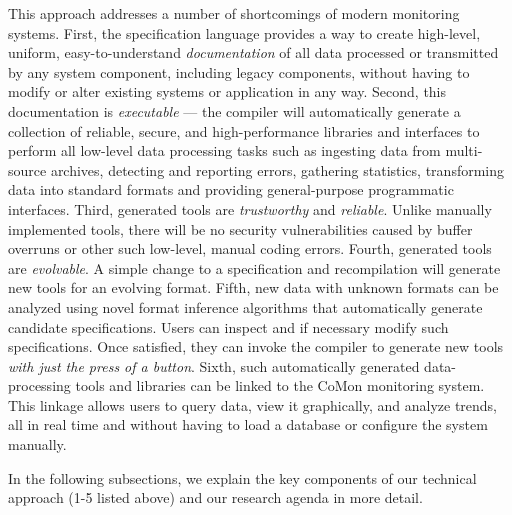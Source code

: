 

This approach addresses a number of shortcomings of modern monitoring
systems.  First, the \pads{} specification language provides a 
way to create high-level, uniform, easy-to-understand {\em documentation}
of all data processed or transmitted by any system component, 
including legacy components, without having to modify or alter existing
systems or
application in any way.  Second, this documentation is 
{\em executable} --- the
\pads{} compiler will automatically generate a collection of
reliable, secure, and high-performance libraries and interfaces
to perform all low-level data processing tasks such as ingesting
data from multi-source archives, detecting and reporting
errors, gathering statistics, 
transforming data into standard formats and providing
general-purpose programmatic interfaces.  Third, generated
tools are {\em trustworthy} and {\em reliable}. Unlike manually 
implemented tools, there will be no security vulnerabilities caused by
buffer overruns or other such low-level, manual coding errors.
Fourth, generated tools are {\em evolvable}. A simple change to
a specification and recompilation will generate new tools for
an evolving format.  Fifth, new data with unknown formats can be analyzed
using novel format inference algorithms that automatically generate
candidate specifications.  Users can inspect and if necessary modify
such specifications. Once satisfied, they can invoke the \pads{}
compiler to generate new tools {\em with just the press of a button}.
Sixth, such automatically generated data-processing tools and libraries 
can be linked to the CoMon monitoring
system.  This linkage allows users to query
data, view it graphically, and analyze trends, all in real
time and without having to load a database or configure the system manually.



In the following subsections, we explain the key components of
our technical approach (1-5 listed above) and our research agenda in 
more detail.
